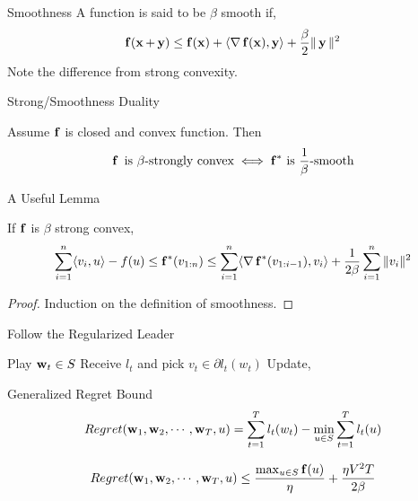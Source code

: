 \begin{frame}{Smoothness}
  A function is said to be $\beta$ smooth if,
  \begin{align*}
    \operatorname{\mathbf{f}}(\operatorname{\mathbf{x}}+\operatorname{\mathbf{y}}) \le \operatorname{\mathbf{f}}(\operatorname{\mathbf{x}}) + \langle {\operatorname{\nabla}\operatorname{\mathbf{f}}(\operatorname{\mathbf{x}})} , {\operatorname{\mathbf{y}}} \rangle +\frac{\beta}{2} \|\operatorname{\mathbf{y}}\|^2
  \end{align*}
  Note the difference from strong convexity.
\end{frame}

\begin{frame}{Strong/Smoothness Duality}
  \begin{theorem}
    Assume $\operatorname{\mathbf{f}}$ is closed and convex function. Then
    \begin{align*}
      \operatorname{\mathbf{f}} \text{ is } \beta\text{-strongly convex} \iff {\operatorname{\mathbf{f}}}^{*} \text{ is } \frac{1}{\beta}\text{-smooth}
    \end{align*}
  \end{theorem}
\end{frame}

\begin{frame}{A Useful Lemma}
  \begin{lemma}
    If $\operatorname{\mathbf{f}}$ is $\beta$ strong convex,
    \begin{align*}
      \sum_{i=1}^n \langle {v_i} , {u} \rangle - f(u) \le {\operatorname{\mathbf{f}}}^{*}(v_{1:n}) \le \sum_{i=1}^n \langle {\operatorname{\nabla}{\operatorname{\mathbf{f}}}^{*}(v_{1:i-1})} , {v_i} \rangle +\frac{1}{2\beta} \sum_{i=1}^n \|v_i\|^2
    \end{align*}
  \end{lemma}
  \begin{proof}
    Induction on the definition of smoothness.
  \end{proof}
\end{frame}

\begin{frame}{Follow the Regularized Leader}
  \begin{algorithmic}
    \State Play $\operatorname{\mathbf{w}}_t \in S$
    \State Receive $l_t$ and pick $v_t \in \partial l_t(w_t)$
    \State Update,
    \EndFor
  \end{algorithmic}
\end{frame}

\begin{frame}{Generalized Regret Bound}
  \begin{align*}
    Regret(\operatorname{\mathbf{w}}_1,\operatorname{\mathbf{w}}_2,\cdots,\operatorname{\mathbf{w}}_T,u) = \sum_{t=1}^T l_t(w_t) - \min_{u \in S} \sum_{t=1}^T l_t(u)
  \end{align*}
  \begin{theorem}
    \begin{align*}    
      Regret(\operatorname{\mathbf{w}}_1,\operatorname{\mathbf{w}}_2,\cdots,\operatorname{\mathbf{w}}_T,u) \le \frac{\max_{u \in S} \operatorname{\mathbf{f}}(u)}{\eta} + \frac{\eta V^2T}{2\beta}
    \end{align*}  
  \end{theorem}
\end{frame}

